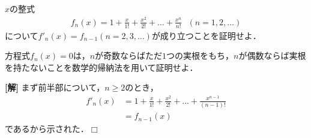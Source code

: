 \documentclass[a4j]{jarticle}
\title{}
\begin{document}

\begin{oframed}
$x$の整式
     \begin{align*}
     f_n(x)=1+\frac{x}{1!}+\frac{x^2}{2!}+\dots+\frac{x^n}{n!} \ \ \ (n=1,2,\dots)
     \end{align*}
について$f'_n(x)=f_{n-1}(n=2,3,\dots)$が成り立つことを証明せよ．

方程式$f_n(x)=0$は，$n$が奇数ならばただ$1$つの実根をもち，$n$が偶数ならば実根を持たないことを数学的帰納法を用いて証明せよ．     
\end{oframed}

\setlength{\columnseprule}{0.4pt}
\begin{multicols}{2}
{\bf[解]} まず前半部について，$n\ge2$のとき，
     \begin{align}
     f'_n(x)&=1+\frac{x}{1!}+\frac{x^2}{2!}+\dots+\frac{x^{n-1}}{(n-1)!}\nonumber \\
     &=f_{n-1}(x) \label{1} 
     \end{align}
であるから示された．$\Box$


\end{multicols}
\end{document}
